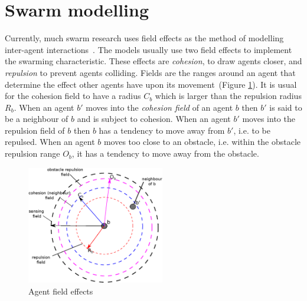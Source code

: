 \documentclass[10pt,journal,letterpaper,twoside]{IEEEtran}
\begin{document}
\IEEEdisplaynotcompsoctitleabstractindextext


%
\IEEEpeerreviewmaketitle

\section{Swarm modelling}
Currently, much swarm research uses field effects as the method of modelling inter-agent interactions~\cite{BAF:06, BAFVM:06, BM:09, APZDAMC:09, GP:02, GP:04, GP:04a, GP:05, GP:11, MYP:09}. The models usually use two field effects to implement the swarming characteristic. These effects are \textit{cohesion}, to draw agents closer, and \textit{repulsion} to prevent agents colliding. Fields are the ranges around an agent that determine the effect other agents have upon its movement~(Figure \ref{methods:FieldEffects}). It is usual for the cohesion field to have a radius $C_b$ which is larger than the repulsion radius $R_b$. When an agent $b'$ moves into the \textit{cohesion field} of an agent $b$ then $b'$ is said to be a neighbour of $b$ and is subject to cohesion. When an agent $b'$ moves into the repulsion field of $b$ then $b$ has a tendency to move away from $b'$, i.e. to be repulsed. When an agent $b$ moves too close to an obstacle, i.e. within the obstacle repulsion range $O_b$, it has a tendency to move away from the obstacle.

\begin{figure}
\begin{center}
\includegraphics[width=6cm]{figures/FieldEffects}
\end{center}
\caption{Agent field effects\label{methods:FieldEffects}}
\end{figure}
\end{document}
